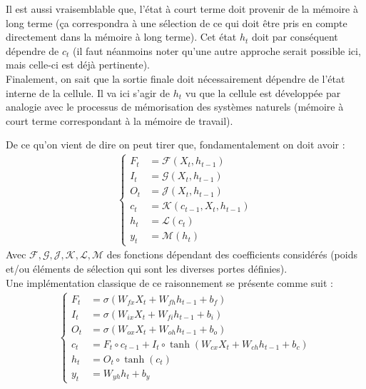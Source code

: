 Il est aussi vraisemblable que, l'état à court terme doit provenir de la mémoire à long terme (ça correspondra à une sélection de ce qui doit être pris en compte directement dans la mémoire à long terme). Cet état $ h_{t} $ doit par conséquent dépendre de $ c_{t} $ (il faut néanmoins noter qu'une autre approche serait possible ici, mais celle-ci est déjà pertinente).\\
Finalement, on sait que la sortie finale doit nécessairement dépendre de l'état interne de la cellule. Il va ici s'agir de $ h_{t} $ vu que la cellule est développée par analogie avec le processus de mémorisation des systèmes naturels (mémoire à court terme correspondant à la mémoire de travail).

De ce qu'on vient de dire on peut tirer que, fondamentalement on doit avoir :
\begin{eqnarray}
\begin{cases}
F_{t} &= \mathcal{F}(X_{t},h_{t-1})\\
I_{t} &= \mathcal{G}(X_{t},h_{t-1})\\
O_{t} &= \mathcal{J}(X_{t},h_{t-1})\\
c_{t} &= \mathcal{K}(c_{t-1},X_{t},h_{t-1})\\
h_{t} &= \mathcal{L}(c_{t})\\
y_{t} &= \mathcal{M}(h_{t})
\end{cases}
\end{eqnarray}
Avec $ \mathcal{F}, \mathcal{G}, \mathcal{J}, \mathcal{K}, \mathcal{L}, \mathcal{M} $ des fonctions dépendant des coefficients considérés (poids et/ou éléments de sélection qui sont les diverses portes définies).\\
Une implémentation classique de ce raisonnement se présente comme suit \cite{geron2020deep,ganegedara2018natural} :
\begin{eqnarray}
\begin{cases}
F_{t} &= \sigma\left( W_{fx}X_{t}+W_{fh}h_{t-1}+b_{f} \right)\\
I_{t} &= \sigma\left( W_{ix}X_{t}+W_{fi}h_{t-1}+b_{i} \right)\\
O_{t} &= \sigma\left( W_{ox}X_{t}+W_{oh}h_{t-1}+b_{o} \right)\\
c_{t} &= F_{t}\circ c_{t-1} + I_{t}\circ \tanh\left( W_{cx}X_{t}+W_{ch}h_{t-1}+b_{c} \right)\\
h_{t} &= O_{t}\circ \tanh(c_{t})\\
y_{t} &= W_{yh}h_{t}+b_{y}
\end{cases}
\end{eqnarray}
